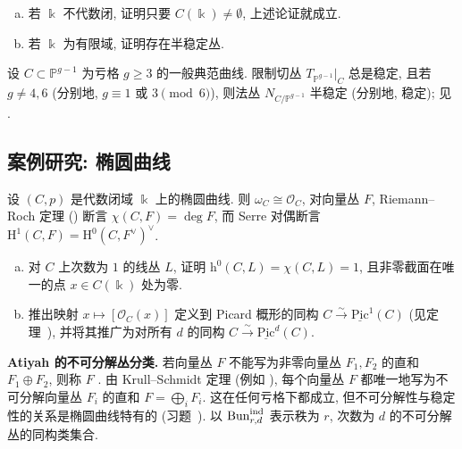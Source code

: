 \begin{exercise}\label{src:9.1.40}
\begin{enumerate}[(a)]
\item 若 $\Bbbk$ 不代数闭, 证明只要 $C(\Bbbk)\ne\emptyset$, 上述论证就成立.
\item 若 $\Bbbk$ 为有限域, 证明存在半稳定丛.
\end{enumerate}
\end{exercise}
\begin{example}[来自几何的例子]\label{src:9.1.41}
设 $C\subset\mathbb P^{g-1}$ 为亏格 $g\geq3$ 的一般典范曲线. 限制切丛 $T_{\mathbb P^{g-1}}|_C$ 总是稳定, 且若 $g\ne4,6$ (分别地, $g\equiv1$ 或 $3\pmod6$), 则法丛 $N_{C/\mathbb P^{g-1}}$ 半稳定 (分别地, 稳定); 见 \cite{CLV23}.
\end{example}
\subsection{案例研究: 椭圆曲线}\label{src:9.1.6-subsection}
设 $(C,p)$ 是代数闭域 $\Bbbk$ 上的椭圆曲线. 则 $\omega_C\cong\mathcal O_C$, 对向量丛 $F$, Riemann--Roch 定理 () 断言 $\chi(C,F)=\deg F$, 而 Serre 对偶断言 $\mathrm H^1(C,F)=\mathrm H^0(C,F^\vee)^\vee$.
\begin{exercise}[线丛]\label{src:9.1.42}
\begin{enumerate}[(a)]
\item 对 $C$ 上次数为 $1$ 的线丛 $L$, 证明 $\mathrm h^0(C,L)=\chi(C,L)=1$, 且非零截面在唯一的点 $x\in C(\Bbbk)$ 处为零.
\item 推出映射 $x\mapsto[\mathcal O_C(x)]$ 定义到 Picard 概形的同构 $C\xrightarrow{\sim}\underline{\mathrm{Pic}}^1(C)$ (见定理~), 并将其推广为对所有 $d$ 的同构 $C\xrightarrow{\sim}\underline{\mathrm{Pic}}^d(C)$.
\end{enumerate}
\end{exercise}
\textbf{Atiyah 的不可分解丛分类.} 若向量丛 $F$ 不能写为非零向量丛 $F_1,F_2$ 的直和 $F_1\oplus F_2$, 则称 $F$ . 由 Krull--Schmidt 定理 (例如 \cite{Ati56}), 每个向量丛 $F$ 都唯一地写为不可分解向量丛 $F_i$ 的直和 $F=\bigoplus_iF_i$. 这在任何亏格下都成立, 但不可分解性与稳定性的关系是椭圆曲线特有的 (习题~). 以 $\operatorname{Bun}_{r,d}^{\mathrm{ind}}$ 表示秩为 $r$, 次数为 $d$ 的不可分解丛的同构类集合.
